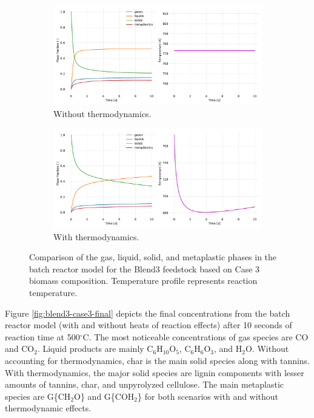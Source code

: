 \begin{figure}[H]
    \begin{subfigure}{\textwidth}
        \centering
        \includegraphics[width=\textwidth]{figures/blend3-case3-phases-temp.pdf}
        \caption{Without thermodynamics.}
    \end{subfigure}
    \begin{subfigure}{\textwidth}
        \centering
        \includegraphics[width=\textwidth]{figures/blend3-case3-phases-temp-thermo.pdf}
        \caption{With thermodynamics.}
    \end{subfigure}
    \caption{Comparison of the gas, liquid, solid, and metaplastic phases in the batch reactor model for the Blend3 feedstock based on Case 3 biomass composition. Temperature profile represents reaction temperature.}
    \label{fig:blend3-case3-phases-temp}
\end{figure}

Figure \ref{fig:blend3-case3-final} depicts the final concentrations from the batch reactor model (with and without heats of reaction effects) after 10 seconds of reaction time at 500$^{\circ}$C. The most noticeable concentrations of gas species are CO and CO$_2$. Liquid products are mainly C$_6$H$_{10}$O$_5$, C$_6$H$_6$O$_3$, and H$_2$O. Without accounting for thermodynamics, char is the main solid species along with tannins. With thermodynamics, the major solid species are lignin components with lesser amounts of tannins, char, and unpyrolyzed cellulose. The main metaplastic species are G\{CH$_2$O\} and G\{COH$_2$\} for both scenarios with and without thermodynamic effects.

